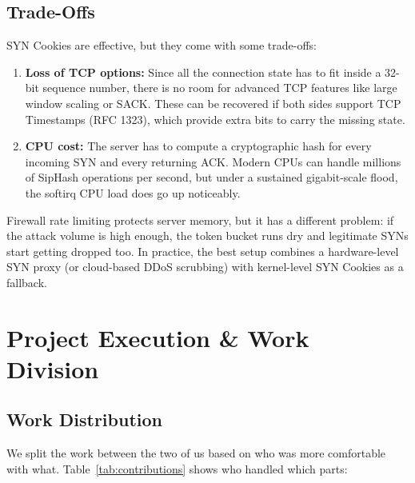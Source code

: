 \documentclass[11pt,a4paper]{report}
\begin{document}
\section{Trade-Offs}
SYN Cookies are effective, but they come with some trade-offs:
\begin{enumerate}
    \item \textbf{Loss of TCP options:} Since all the connection state has to fit inside a 32-bit sequence number, there is no room for advanced TCP features like large window scaling or SACK. These can be recovered if both sides support TCP Timestamps (RFC 1323), which provide extra bits to carry the missing state.
    \item \textbf{CPU cost:} The server has to compute a cryptographic hash for every incoming SYN and every returning ACK. Modern CPUs can handle millions of SipHash operations per second, but under a sustained gigabit-scale flood, the softirq CPU load does go up noticeably.
\end{enumerate}

Firewall rate limiting protects server memory, but it has a different problem: if the attack volume is high enough, the token bucket runs dry and legitimate SYNs start getting dropped too. In practice, the best setup combines a hardware-level SYN proxy (or cloud-based DDoS scrubbing) with kernel-level SYN Cookies as a fallback.

\chapter{Project Execution \& Work Division}

\section{Work Distribution}
We split the work between the two of us based on who was more comfortable with what. Table~\ref{tab:contributions} shows who handled which parts:
\end{document}
